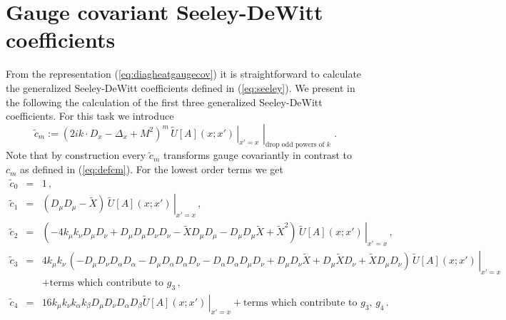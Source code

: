\documentclass[a4paper,showpacs,showkeys,prd,nofootinbib]{revtex4}
\begin{document}



\section{Gauge covariant Seeley-DeWitt coefficients}
\label{sec:gvsdw}

From the representation (\ref{eq:diagheatgaugecov}) it is straightforward to 
calculate the generalized Seeley-DeWitt coefficients defined in (\ref{eq:seeley}).
We present in the following the calculation of the first three generalized Seeley-DeWitt
coefficients. For this task we introduce
\begin{equation}
  \label{eq:deftildec}
\tilde c_m := \left. \left . (2 i k \cdot D_x - \Delta_x + M^2)^m
\, \tilde U[A](x;x') \, \right\vert_{x' = x}  \,\,
\right\vert_{\mbox{drop odd powers of $k$}}  \,\,.
\end{equation}
Note that by construction every $\tilde c_m$ transforms gauge covariantly in contrast to
$c_m$ as defined in (\ref{eq:defcm}).
For the lowest order terms we get
\begin{subequations}
\label{eq:ctcoeff}
\begin{eqnarray}
\label{eq:ctcoeff0}
\tilde c_0 & = & 1 \,,
\\  
\label{eq:ctcoeff1}
\tilde c_1 & = & \left. (D_\mu D_\mu - \tilde X) \, \tilde U[A](x;x') 
\, \right\vert_{x' = x}  \,,
\\
\label{eq:ctcoeff2}
\tilde c_2 & = & \left. (-4 k_\mu k_\nu D_\mu D_\nu + D_\mu D_\mu D_\nu D_\nu 
- \tilde X D_\mu D_\mu - D_\mu D_\mu \tilde X + \tilde X^2 ) \,
\tilde U[A](x;x') \, \right\vert_{x' = x}  \,,
\\
\tilde c_3 & = & \left. 4 k_\mu k_\nu \, (-D_\mu D_\nu D_\alpha D_\alpha 
- D_\mu D_\alpha D_\alpha D_\nu - D_\alpha D_\alpha D_\mu D_\nu 
+ D_\mu D_\nu \tilde X + D_\mu \tilde X D_\nu + \tilde X D_\mu D_\nu )
\, \tilde U[A](x;x') \, \right\vert_{x' = x}  
\nonumber \\
\label{eq:ctcoeff3}
&& + \mbox{terms which contribute to $g_3$}  \,,
\\
\label{eq:ctcoeff4}
\tilde c_4 & = & \left. 16 k_\mu k_\nu k_\alpha k_\beta 
D_\mu D_\nu D_\alpha D_\beta \tilde U[A](x;x') \, \right\vert_{x' = x}  
+ \mbox{terms which contribute to $g_3$, $g_4$}  \,.
\end{eqnarray}
\end{subequations}
\end{document}
